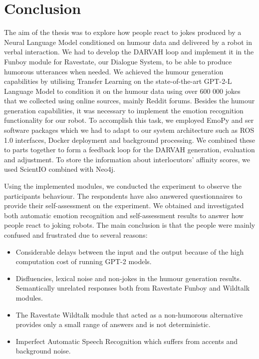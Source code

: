 
\chapter{Conclusion}\label{chapter:conclusion}

The aim of the thesis was to explore how people react to jokes produced by a Neural Language Model conditioned on humour data and delivered by a robot in verbal interaction. We had to develop the DARVAH loop and implement it in the Funboy module for Ravestate, our Dialogue System, to be able to produce humorous utterances when needed. We achieved the humour generation capabilities by utilising Transfer Learning on the state-of-the-art GPT-2-L Language Model to condition it on the humour data using over 600 000 jokes that we collected using online sources, mainly Reddit forums. Besides the humour generation capabilities, it was necessary to implement the emotion recognition functionality for our robot. To accomplish this task, we employed EmoPy and \acrfull{ser} software packages which we had to adapt to our system architecture such as ROS 1.0 interfaces, Docker deployment and background processing. We combined these to parts together to form a feedback loop for the DARVAH generation, evaluation and adjustment. To store the information about interlocutors' affinity scores, we used ScientIO combined with Neo4j.  

Using the implemented modules, we conducted the experiment to observe the participants behaviour. The respondents have also answered questionnaires to provide their self-assessment on the experiment. We obtained and investigated both automatic emotion recognition and self-assessment results to answer how people react to joking robots. The main conclusion is that the people were mainly confused and frustrated due to several reasons:

\begin{itemize}
    \item Considerable delays between the input and the output because of the high computation cost of running GPT-2 models.  
    \item Disfluencies, lexical noise and non-jokes in the humour generation results. Semantically unrelated responses both from Ravestate Funboy and Wildtalk modules.
    \item The Ravestate Wildtalk module that acted as a non-humorous alternative provides only a small range of answers and is not deterministic.  
    \item Imperfect Automatic Speech Recognition which suffers from accents and background noise.
\end{itemize}

